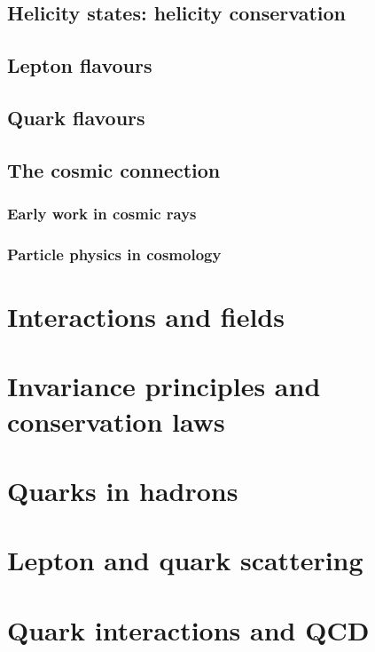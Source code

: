 \documentclass[en, device=normal]{elegantnote}
\begin{document}
\subsection{Helicity states: helicity conservation}

\subsection{Lepton flavours}

\subsection{Quark flavours}

\subsection{The cosmic connection}

\subsubsection{Early work in cosmic rays}

\subsubsection{Particle physics in cosmology}

\section{Interactions and fields}

\section{Invariance principles and conservation laws}

\section{Quarks in hadrons}

\section{Lepton and quark scattering}

\section{Quark interactions and QCD}
\end{document}
